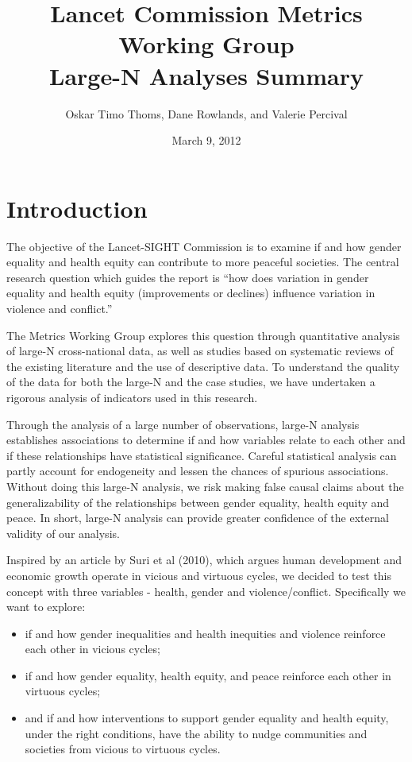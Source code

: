 \documentclass[12pt]{article}
\author{Oskar Timo Thoms, Dane Rowlands, and Valerie Percival}
\title{Lancet Commission Metrics Working Group\\Large-N Analyses Summary}
\date{March 9, 2012}
\begin{document}
\maketitle
\tableofcontents

\section{Introduction}


The objective of the Lancet-SIGHT Commission is to examine if and how gender equality and health equity can contribute to more peaceful societies.
The central research question which guides the report is \enquote{how does variation in gender equality and health equity (improvements or declines) influence variation in violence and conflict.}

The Metrics Working Group explores this question through quantitative analysis of large-N cross-national data, as well as studies based on systematic reviews of the existing literature and the use of descriptive data. To understand the quality of the data for both the large-N and the case studies, we have undertaken a rigorous analysis of indicators used in this research.

Through the analysis of a large number of observations, large-N analysis establishes associations to determine if and how variables relate to each other and if these relationships have statistical significance. Careful statistical analysis can partly account for endogeneity and lessen the chances of spurious associations. Without doing this large-N analysis, we risk making false causal claims about the generalizability of the relationships between gender equality, health equity and peace. In short, large-N analysis can provide greater confidence of the external validity of our analysis.

Inspired by an article by Suri et al (2010), which argues human development and economic growth operate in vicious and virtuous cycles, we decided to test this concept with three variables - health, gender and violence/conflict. Specifically we want to explore:
\begin{itemize}
\item if and how gender inequalities and health inequities and violence reinforce each other in vicious cycles;
\item if and how gender equality, health equity, and peace reinforce each other in virtuous cycles;
\item and if and how interventions to support gender equality and health equity, under the right conditions, have the ability to nudge communities and societies from vicious to virtuous cycles.
\end{itemize}
\end{document}
